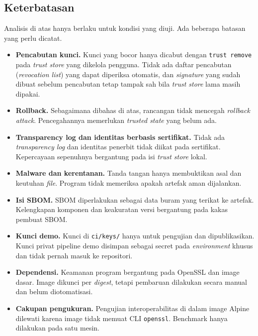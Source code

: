 \subsection{Keterbatasan}
Analisis di atas hanya berlaku untuk kondisi yang diuji. Ada beberapa batasan yang perlu dicatat.

\begin{itemize}
  \item \textbf{Pencabutan kunci.} Kunci yang bocor hanya dicabut dengan \texttt{trust remove}
    pada \textit{trust store} yang dikelola pengguna. Tidak ada daftar pencabutan (\textit{revocation
    list}) yang dapat diperiksa otomatis, dan \textit{signature} yang sudah dibuat sebelum pencabutan
    tetap tampak sah bila \textit{trust store} lama masih dipakai.
  \item \textbf{Rollback.} Sebagaimana dibahas di atas, rancangan tidak mencegah
    \textit{rollback attack}. Pencegahannya memerlukan \textit{trusted state} yang belum ada.
  \item \textbf{Transparency log dan identitas berbasis sertifikat.} Tidak ada \textit{transparency log}
    dan identitas penerbit tidak diikat pada sertifikat. Kepercayaan sepenuhnya bergantung pada isi
    \textit{trust store} lokal.
  \item \textbf{Malware dan kerentanan.} Tanda tangan hanya membuktikan asal dan keutuhan \textit{file}.
    Program tidak memeriksa apakah artefak aman dijalankan.
  \item \textbf{Isi SBOM.} SBOM diperlakukan sebagai data buram yang terikat ke artefak. Kelengkapan
    komponen dan keakuratan versi bergantung pada kakas pembuat SBOM.
  \item \textbf{Kunci demo.} Kunci di \texttt{ci/keys/} hanya untuk pengujian dan dipublikasikan.
    Kunci privat pipeline demo disimpan sebagai secret pada \textit{environment} khusus dan tidak
    pernah masuk ke repositori.
  \item \textbf{Dependensi.} Keamanan program bergantung pada OpenSSL dan image dasar. Image dikunci
    per \textit{digest}, tetapi pembaruan dilakukan secara manual dan belum diotomatisasi.
  \item \textbf{Cakupan pengukuran.} Pengujian interoperabilitas di dalam image Alpine dilewati karena
    image tidak memuat CLI \texttt{openssl}. Benchmark hanya dilakukan pada satu mesin.
\end{itemize}
